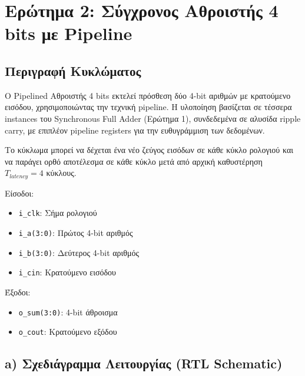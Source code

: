\documentclass[12pt]{article}
\begin{document}
\newpage
\section*{Ερώτημα 2: Σύγχρονος Αθροιστής 4 bits με Pipeline}

\subsection*{Περιγραφή Κυκλώματος}

Ο Pipelined Αθροιστής 4 bits εκτελεί πρόσθεση δύο 4-bit αριθμών με κρατούμενο εισόδου, χρησιμοποιώντας την τεχνική pipeline. Η υλοποίηση βασίζεται σε τέσσερα instances του Synchronous Full Adder (Ερώτημα 1), συνδεδεμένα σε αλυσίδα ripple carry, με επιπλέον pipeline registers για την ευθυγράμμιση των δεδομένων.

Το κύκλωμα μπορεί να δέχεται ένα νέο ζεύγος εισόδων σε κάθε κύκλο ρολογιού και να παράγει ορθό αποτέλεσμα σε κάθε κύκλο μετά από αρχική καθυστέρηση $T_{latency} = 4$ κύκλους.

Είσοδοι:
\begin{itemize}
    \item \texttt{i\_clk}: Σήμα ρολογιού
    \item \texttt{i\_a(3:0)}: Πρώτος 4-bit αριθμός
    \item \texttt{i\_b(3:0)}: Δεύτερος 4-bit αριθμός
    \item \texttt{i\_cin}: Κρατούμενο εισόδου
\end{itemize}

Έξοδοι:
\begin{itemize}
    \item \texttt{o\_sum(3:0)}: 4-bit άθροισμα
    \item \texttt{o\_cout}: Κρατούμενο εξόδου
\end{itemize}

\subsection*{a) Σχεδιάγραμμα Λειτουργίας (RTL Schematic)}
\end{document}
